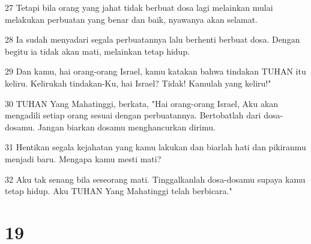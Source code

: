 \par 27 Tetapi bila orang yang jahat tidak berbuat dosa lagi melainkan mulai melakukan perbuatan yang benar dan baik, nyawanya akan selamat.
\par 28 Ia sudah menyadari segala perbuatannya lalu berhenti berbuat dosa. Dengan begitu ia tidak akan mati, melainkan tetap hidup.
\par 29 Dan kamu, hai orang-orang Israel, kamu katakan bahwa tindakan TUHAN itu keliru. Kelirukah tindakan-Ku, hai Israel? Tidak! Kamulah yang keliru!"
\par 30 TUHAN Yang Mahatinggi, berkata, "Hai orang-orang Israel, Aku akan mengadili setiap orang sesuai dengan perbuatannya. Bertobatlah dari dosa-dosamu. Jangan biarkan dosamu menghancurkan dirimu.
\par 31 Hentikan segala kejahatan yang kamu lakukan dan biarlah hati dan pikiranmu menjadi baru. Mengapa kamu mesti mati?
\par 32 Aku tak senang bila seseorang mati. Tinggalkanlah dosa-dosamu supaya kamu tetap hidup. Aku TUHAN Yang Mahatinggi telah berbicara."

\chapter{19}

